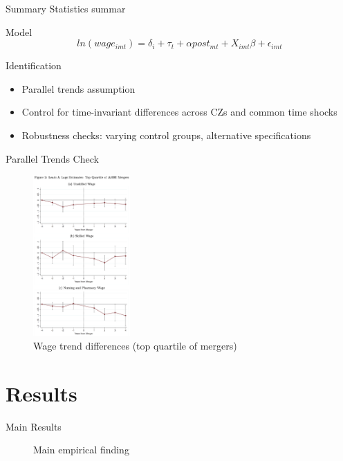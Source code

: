 \documentclass{beamer}
\begin{document}
\begin{frame}{Summary Statistics}
summar
\end{frame}

\begin{frame}{Model}
  \begin{equation}
    ln(wage_{imt}) = \delta_i + \tau_t + \alpha post_{mt} + X_{imt}\beta + \epsilon_{imt}
  \end{equation}
\end{frame}

\begin{frame}{Identification}
  \begin{itemize}
    \item Parallel trends assumption
    \item Control for time-invariant differences across CZs and common time shocks
    \item Robustness checks: varying control groups, alternative specifications
  \end{itemize}
\end{frame}

\begin{frame}{Parallel Trends Check}
  \begin{figure}
    \centering
    \includegraphics[width=0.33\textwidth]{parallel_trends.png}
    \caption{Wage trend differences (top quartile of mergers)}
  \end{figure}
\end{frame}

\section{Results}

\begin{frame}{Main Results}
  \begin{figure}
    \centering
    \caption{Main empirical finding}
  \end{figure}
\end{frame}
\end{document}
